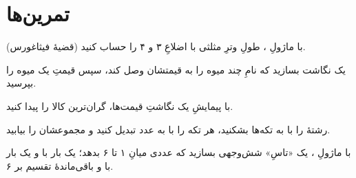 \section{تمرین‌ها}

\exercise با ماژولِ ، طولِ وترِ مثلثی با اضلاعِ ۳ و ۴ را حساب کنید
(قضیهٔ فیثاغورس).

\exercise یک نگاشت بسازید که نامِ چند میوه را به قیمتشان وصل کند، سپس قیمتِ یک
میوه را بپرسید.

\exercise با پیمایشِ یک نگاشتِ قیمت‌ها، گران‌ترین کالا را پیدا کنید.

\exercise رشتهٔ  را با  به تکه‌ها بشکنید، هر
تکه را با  به عدد تبدیل کنید و مجموعشان را بیابید.

\exercise با ماژولِ ، یک «تاسِ» شش‌وجهی بسازید که عددی میانِ ۱ تا ۶
بدهد؛ یک بار با  و یک بار با  و
باقی‌ماندهٔ تقسیم بر ۶.
